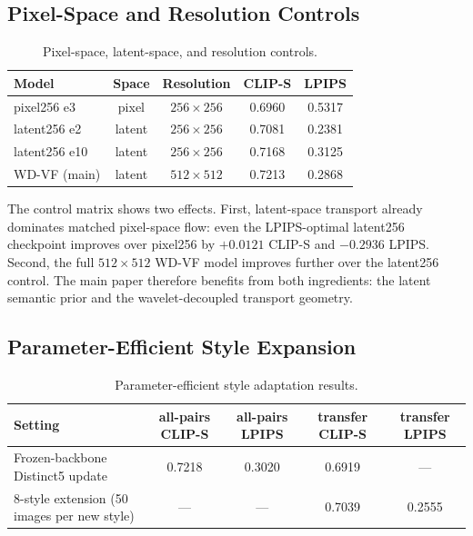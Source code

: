 \documentclass[10pt,letterpaper]{article}
\begin{document}
\subsection{Pixel-Space and Resolution Controls}
\label{sec:pixel_latent}

\begin{table}[h]
\centering
\caption{Pixel-space, latent-space, and resolution controls.}
\label{tab:pixel_latent}
\small
\begin{tabular}{@{}lcccc@{}}
\toprule
Model & Space & Resolution & CLIP-S & LPIPS \\
\midrule
pixel256 e3 & pixel & $256\times256$ & 0.6960 & 0.5317 \\
latent256 e2 & latent & $256\times256$ & 0.7081 & 0.2381 \\
latent256 e10 & latent & $256\times256$ & 0.7168 & 0.3125 \\
WD-VF (main) & latent & $512\times512$ & 0.7213 & 0.2868 \\
\bottomrule
\end{tabular}
\end{table}

The control matrix shows two effects. First, latent-space transport already dominates matched pixel-space flow: even the LPIPS-optimal latent256 checkpoint improves over pixel256 by $+0.0121$ CLIP-S and $-0.2936$ LPIPS. Second, the full $512\times512$ WD-VF model improves further over the latent256 control. The main paper therefore benefits from both ingredients: the latent semantic prior and the wavelet-decoupled transport geometry.

\subsection{Parameter-Efficient Style Expansion}
\label{sec:fewshot}

\begin{table}[h]
\centering
\caption{Parameter-efficient style adaptation results.}
\label{tab:fewshot}
\small
\begin{tabular}{@{}lcccc@{}}
\toprule
Setting & all-pairs CLIP-S & all-pairs LPIPS & transfer CLIP-S & transfer LPIPS \\
\midrule
Frozen-backbone Distinct5 update & 0.7218 & 0.3020 & 0.6919 & --- \\
8-style extension (50 images per new style) & --- & --- & 0.7039 & 0.2555 \\
\bottomrule
\end{tabular}
\end{table}
\end{document}
